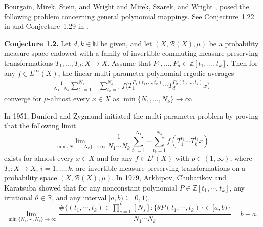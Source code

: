 \documentclass[10pt,a4paper]{amsart}
\numberwithin{equation}{section}
\begin{document}
 
Bourgain, Mirek, Stein, and Wright \cite{B4} and Mirek, Szarek, and Wright \cite{MSW1}, posed the following problem concerning general polynomial mappings. See Conjecture~1.22 in \cite{B4} and Conjecture~1.29 in \cite{MSW1}.


\medskip
\noindent
\textbf{Conjecture 1.2.}
Let $d,k\in\mathbb{N}$ be given, and let $(X,\mathcal{B}(X),\mu)$ be a probability measure space endowed with a family of invertible commuting measure-preserving transformations $T_1,\dots,T_d:X\to X$. Assume that $P_1,\dots,P_d\in\mathbb{Z}[t_1,\dots,t_k]$. Then for any $f\in L^\infty(X)$, the linear multi-parameter polynomial ergodic averages
\begin{align*}
	\frac{1}{N_1\cdots N_k}
\sum_{t_1=1}^{N_1}\cdots\sum_{t_k=1}^{N_k}
	f\bigl(T_1^{P_1(t_1,\dots,t_k)}\cdots T_d^{P_d(t_1,\dots,t_k)}x\bigr)
\end{align*}
converge for $\mu$-almost every $x\in X$ as $\min\{N_1,\dots,N_k\}\to\infty$.

\medskip


In 1951, Dunford  \cite{Dun} and Zygmund \cite{Zyg}  initiated the  multi-parameter problem by proving that the following limit
$$
\lim_{\min\{N_1,\dots,N_k\}\to\infty}	\frac{1}{N_1\cdots N_k}
\sum_{t_1=1}^{N_1}\cdots\sum_{t_k=1}^{N_k} f(T_1^{t_1} \cdots T_k^{t_k} x)
$$
exists for almost every $x \in X$ and for any $f \in L^p(X)$ with $p \in(1, \infty)$, where $T_i:X\to X$, $i=1,\ldots,k$, are invertible measure-preserving transformations  on a probability space $(X, \mathcal{B}(X), \mu)$.  In 1979, Arkhipov, Chubarikov and Karatsuba \cite{AC}  showed that for any nonconstant polynomial $P \in \mathbb{Z}[t_1, \cdots, t_{k}]$, any irrational $\theta \in \mathbb{R}$, and any interval $[a, b) \subseteq[0,1)$,
$$\lim _{\min \{N_1, \cdots, N_k\} \rightarrow \infty} \frac{\#\{(t_1, \cdots, t_k) \in \prod_{s=1}^{k}[N_s]:\{\theta P(t_1, \cdots, t_k)\} \in[a, b)\}}{N_1 \cdots N_k}=b-a.$$ 
\end{document}
